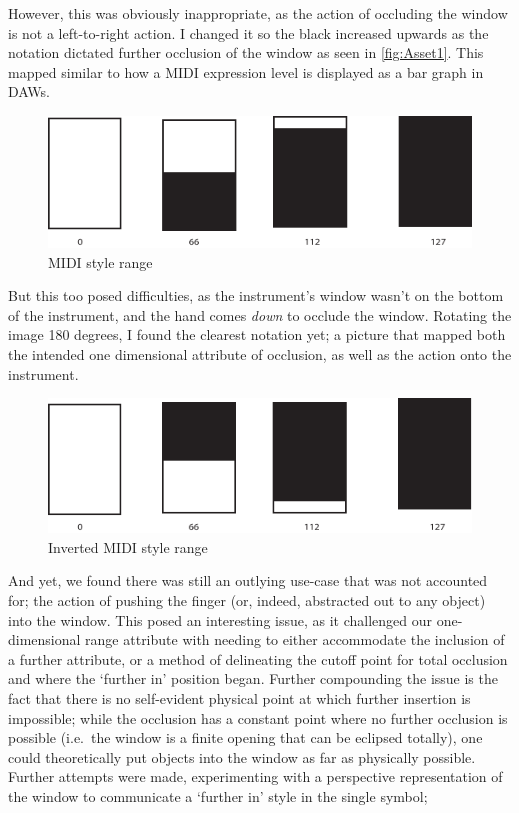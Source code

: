 However, this was obviously inappropriate, as the action of occluding the window is not a left-to-right action.
I changed it so the black increased upwards as the notation dictated further occlusion of the window as seen in \autoref{fig:Asset1}. 
This mapped similar to how a MIDI expression level is displayed as a bar graph in DAWs. 
\begin{figure}
\includegraphics[width=\linewidth]{./resources/Asset 1.pdf}
\caption{MIDI style range}\label{fig:Asset1}
\end{figure}

But this too posed difficulties, as the instrument's window wasn't on the bottom of the instrument, and the hand comes \emph{down} to occlude the window. 
Rotating the image 180 degrees, I found the clearest notation yet; a picture that mapped both the intended one dimensional attribute of occlusion, as well as the action onto the instrument.

\begin{figure}
\includegraphics[width=\linewidth]{./resources/Asset 2.pdf}
\caption{Inverted MIDI style range}\label{fig:Asset2}
\end{figure}

And yet, we found there was still an outlying use-case that was not accounted for; the action of pushing the finger (or, indeed, abstracted out to any object) into the window. 
This posed an interesting issue, as it challenged our one-dimensional range attribute with needing to either accommodate the inclusion of a further attribute, or a method of delineating the cutoff point for total occlusion and where the `further in' position began. 
Further compounding the issue is the fact that there is no self-evident physical point at which further insertion is impossible; 
while the occlusion has a constant point where no further occlusion is possible (i.e.\ the window is a finite opening that can be eclipsed totally), one could theoretically put objects into the window as far as physically possible.
Further attempts were made, experimenting with a perspective representation of the window to communicate a `further in' style in the single symbol; 

